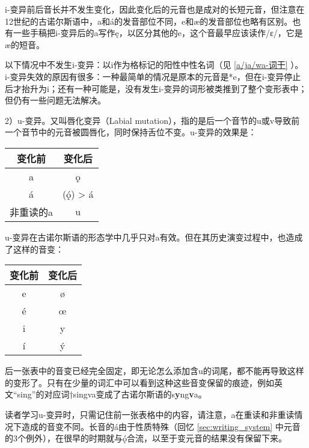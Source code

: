 i-变异前后音长并不发生变化，因此变化后的元音也是成对的长短元音，但注意在12世纪的古诺尔斯语中，a和á的发音部位不同，e和æ的发音部位也略有区别。也有一些手稿把i-变异后的a写作ę，以区分其他的e，这个音最早应该读作/ɛ/，它是æ的短音。

以下情况中不发生i-变异：以i作为格标记的阳性中性名词（见 \ref{a/ja/wa-词干} ）。i-变异失效的原因有很多：一种最简单的情况是原本的元音是*e，但在i-变异停止后才抬升为i；还有一种可能是，没有发生i-变异的词形被类推到了整个变形表中；但仍有一些问题无法解决。

2）u-变异。又叫唇化变异（Labial mutation），指的是后一个音节的u或v导致前一个音节中的元音被圆唇化，同时保持舌位不变。u-变异的效果是：

\begin{table}[H]
  \centering
  \begin{tabular}{cc}
    \toprule
    \textbf{变化前} & \textbf{变化后} \\ \midrule
    a            & ǫ            \\
    á            & (ǫ́) > á      \\
    非重读的a        & u            \\ \bottomrule
  \end{tabular}
\end{table}

u-变异在古诺尔斯语的形态学中几乎只对a有效。但在其历史演变过程中，也造成了这样的音变：

\begin{table}[H]
  \centering
  \begin{tabular}{cc}
    \toprule
    \textbf{变化前} & \textbf{变化后} \\ \midrule
    e            & ø            \\
    é            & œ            \\
    i            & y            \\
    í            & ý            \\ \bottomrule
  \end{tabular}
\end{table}

后一张表中的音变已经完全固定，即无论怎么添加含u的词尾，都不能再导致这样的变形了。只有在少量的词汇中可以看到这种这些音变保留的痕迹，例如英文``sing''的对应词†singva变成了古诺尔斯语的s\textbf{y}ng\textbf{v}a。

读者学习u-变异时，只需记住前一张表格中的内容，请注意，a在重读和非重读情况下造成的音变不同。长音的á由于性质特殊（回忆 \ref{sec:writing_system} 中元音的3个例外），在很早的时期就与ǫ́合流，以至于变元音的结果没有保留下来。

